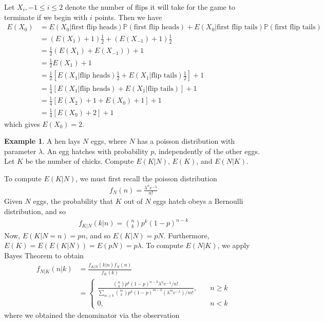 \documentclass[12pt]{article}
\newcommand{\prob}{\mathbb{P}}
\theoremstyle{plain}
\theoremstyle{definition}
\newtheorem*{example}{Example}
\theoremstyle{remark}
\numberwithin{equation}{section}  %
\begin{document}
Let $X_i, -1 \le i \le 2$ denote the number of flips it will take for the game
to terminate if we begin with $i$ points. Then we have
\begin{align*}
E(X_0) & = E(X_0 | \text{first flip heads})\prob(\text{first flip heads}) +
E(X_0 | \text{first flip tails}) \prob(\text{first flip tails})
\\
& = (E(X_1) + 1) \frac{1}{2} + (E(X_{-1}) + 1) \frac{1}{2}
\\
& = \frac{1}{2}(E(X_1) + E(X_{-1})) + 1
\\
& = \frac{1}{2}E(X_1) + 1
\\
& = \frac{1}{2}[E(X_1 | \text{flip heads}) \frac{1}{2} + E(X_1 | \text{flip
tails}) \frac{1}{2}] + 1
\\
& = \frac{1}{4}[E(X_1 | \text{flip heads}) + E(X_1 | \text{flip
tails})] + 1
\\
& = \frac{1}{4} [ E(X_2) + 1  + E(X_0) + 1] + 1
\\
& = \frac{1}{4}[ E(X_0) + 2] + 1
\end{align*}
which gives $E(X_0) = 2$.
\begin{example}
A hen lays $N$ eggs, where $N$ has a poisson distribution with parameter
$\lambda$. An egg hatches with probability $p$, independently  of the other
eggs. Let $K$ be the number of chicks. Compute $E(K|N)$, $E(K)$, and $E(N | K)$.
\end{example}
To compute $E(K|N)$, we must first recall the poisson distribution
\begin{align*}
f_N(n) = \frac{\lambda^n e^{-\lambda}}{n!}
\end{align*}
Given $N$ eggs, the probability that $K$ out of $N$ eggs hatch obeys a 
Bernoulli distribution, and so 
\begin{align*}
f_{K|N}(k|n) = \binom{n}{k} p^k {(1-p)}^{n-k}
\end{align*}
Now, $E(K | N = n) = pn$, and so $E(K | N) = pN$. Furthermore, $E(K) = E(E(K
| N	)) = E(pN) = p \lambda$.
To compute $E(N | K)$, we apply Bayes Theorem to obtain
\begin{align*}
f_{N|K}(n|k) & = \frac{f_{K|N}(k|n)f_N(n)}{f_K(k)}
\\
& = \begin{cases}
\frac{\binom{n}{k}p^k {(1-p)}^{n-k} \lambda^n
e^{-\lambda}/n!}{\sum_{m \ge k}
\binom{m}{k} p^k {(1 - p)}^{m-k} (\lambda^m e^{-\lambda})/m!}
, \quad & n \ge k
\\
0, \quad & n<k
\end{cases}
\end{align*}
where we obtained the denominator via the observation
\end{document}
